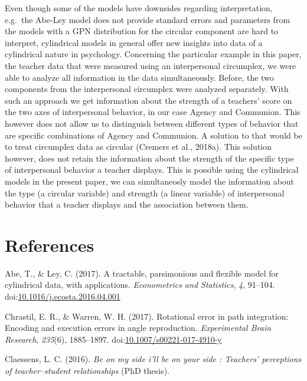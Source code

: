 \documentclass[11pt,]{article}
\begin{document}
Even though some of the models have downsides regarding interpretation,
e.g.~the Abe-Ley model does not provide standard errors and parameters
from the models with a GPN distribution for the circular component are
hard to interpret, cylindrical models in general offer new insights into
data of a cylindrical nature in psychology. Concerning the particular
example in this paper, the teacher data that were measured using an
interpersonal circumplex, we were able to analyze all information in the
data simultaneously. Before, the two components from the interpersonal
circumplex were analyzed separately. With such an approach we get
information about the strength of a teachers' score on the two axes of
interpersonal behavior, in our case Agency and Communion. This however
does not allow us to distinguish between different types of behavior
that are specific combinations of Agency and Communion. A solution to
that would be to treat circumplex data as circular (Cremers et al.,
2018a). This solution however, does not retain the information about the
strength of the specific type of interpersonal behavior a teacher
displays. This is possible using the cylindrical models in the present
paper, we can simultaneosly model the information about the type (a
circular variable) and strength (a linear variable) of interpersonal
behavior that a teacher displays and the association between them.

\newpage

\section*{References}

\hypertarget{refs}{}
\hypertarget{ref-abe2017tractable}{}
Abe, T., \& Ley, C. (2017). A tractable, parsimonious and flexible model
for cylindrical data, with applications. \emph{Econometrics and
Statistics}, \emph{4}, 91--104.
doi:\href{https://doi.org/10.1016/j.ecosta.2016.04.001}{10.1016/j.ecosta.2016.04.001}

\hypertarget{ref-chrastil2017rotational}{}
Chrastil, E. R., \& Warren, W. H. (2017). Rotational error in path
integration: Encoding and execution errors in angle reproduction.
\emph{Experimental Brain Research}, \emph{235}(6), 1885--1897.
doi:\href{https://doi.org/10.1007/s00221-017-4910-y}{10.1007/s00221-017-4910-y}

\hypertarget{ref-Claessens2016side}{}
Claessens, L. C. (2016). \emph{Be on my side i'll be on your side :
Teachers' perceptions of teacher--student relationships} (PhD thesis).
\end{document}
